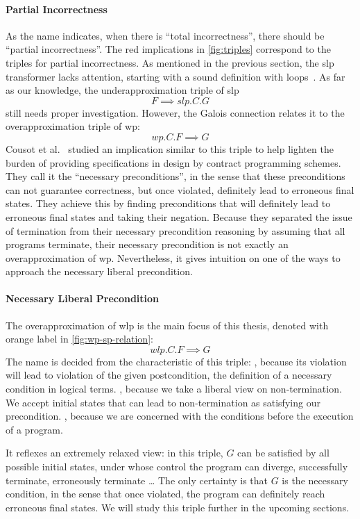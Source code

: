 \paragraph{Partial Incorrectness}
As the name indicates, when there is ``total incorrectness'', there should be ``partial incorrectness''. 
The red implications in \autoref{fig:triples} correspond to the triples for partial incorrectness. 
As mentioned in the previous section, the slp transformer lacks attention, starting with a sound definition with loops~\cite{wulandari2020VerifyingGraphPrograms,li2011NonlinearMathematicsUncertainty}. 
As far as our knowledge, the underapproximation triple of slp 
$$F\implies slp.C.G$$ 
still needs proper investigation. 
However, the Galois connection relates it to the overapproximation triple of wp: 
$$wp.C.F\implies G$$
Cousot et al.~\cite{cousot13} studied an implication similar to this triple to help lighten the burden of providing specifications in design by contract programming schemes. 
They call it the ``necessary preconditions'', in the sense that these preconditions can not guarantee correctness, but once violated, definitely lead to erroneous final states. 
They achieve this by finding preconditions that will definitely lead to erroneous final states and taking their negation. 
Because they separated the issue of termination from their necessary precondition reasoning by assuming that all programs terminate, their necessary precondition is not exactly an overapproximation of wp. 
Nevertheless, it gives intuition on one of the ways to approach the necessary liberal precondition. 

\paragraph{Necessary Liberal Precondition}
The overapproximation of wlp is the main focus of this thesis, denoted with orange label in \autoref{fig:wp-sp-relation}: 
$$wlp.C.F\implies G$$
The name is decided from the characteristic of this triple: 
, because its violation will lead to violation of the given postcondition, the definition of a necessary condition in logical terms. 
, because we take a liberal view on non-termination. We accept initial states that can lead to non-termination as satisfying our precondition. 
, because we are concerned with the conditions before the execution of a program. 

It reflexes an extremely relaxed view: in this triple, $G$ can be satisfied by all possible initial states, under whose control the program can diverge, successfully terminate, erroneously terminate \dots
The only certainty is that $G$ is the necessary condition, in the sense that once violated, the program can definitely reach erroneous final states. 
We will study this triple further in the upcoming sections. 

